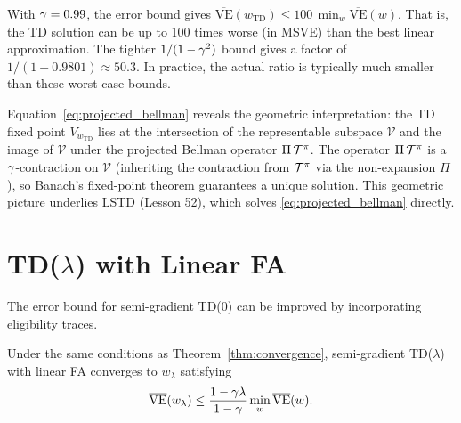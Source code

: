 \documentclass[11pt,a4paper]{article}
\begin{document}
\begin{example}[Error Bound for $\discount = 0.99$]
\label{ex:error_bound}
With $\discount = 0.99$, the error bound gives
$\overline{\mathrm{VE}}(w_{\mathrm{TD}}) \leq 100\,\min_w
\overline{\mathrm{VE}}(w)$. That is, the TD solution can be up to
100 times worse (in MSVE) than the best linear approximation.
The tighter $1/(1-\gamma^2)$ bound gives a factor of
$1/(1-0.9801) \approx 50.3$. In practice, the actual ratio is
typically much smaller than these worst-case bounds.
\end{example}

\begin{rlconnection}[title={The TD Fixed Point as a Projected Bellman Equation}]
Equation~\eqref{eq:projected_bellman} reveals the geometric
interpretation: the TD fixed point $V_{w_\mathrm{TD}}$ lies at
the intersection of the representable subspace $\mathcal{V}$ and
the image of $\mathcal{V}$ under the projected Bellman operator
$\Pi\,\mathcal{T}^\pi$. The operator $\Pi\,\mathcal{T}^\pi$ is
a $\gamma$-contraction on $\mathcal{V}$ (inheriting the
contraction from $\mathcal{T}^\pi$ via the non-expansion $\Pi$),
so Banach's fixed-point theorem guarantees a unique solution. This
geometric picture underlies LSTD (Lesson 52), which solves
\eqref{eq:projected_bellman} directly.
\end{rlconnection}

\section{TD($\lambda$) with Linear FA}
\label{sec:td_lambda_fa}

The error bound for semi-gradient TD(0) can be improved by
incorporating eligibility traces.

\begin{theorem}
\label{thm:td_lambda_bound}
Under the same conditions as Theorem~\ref{thm:convergence},
semi-gradient TD($\lambda$) with linear FA converges to
$w_\lambda$ satisfying
\begin{equation}
  \overline{\mathrm{VE}}(w_\lambda)
  \leq \frac{1-\gamma\lambda}{1-\gamma}
  \min_w \overline{\mathrm{VE}}(w).
  \label{eq:td_lambda_bound}
\end{equation}
\end{theorem}
\end{document}
